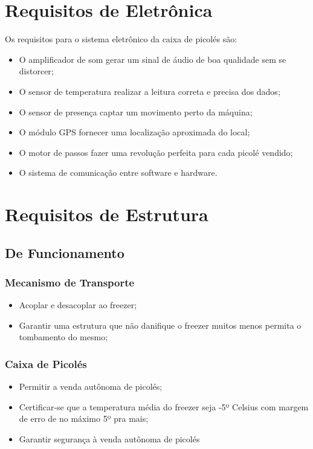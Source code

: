 \section{Requisitos de Eletrônica}

Os requisitos para o sistema eletrônico da caixa de picolés são:

\begin{itemize}
	\item O amplificador de som gerar um sinal de áudio de boa qualidade sem se distorcer;
    \item O sensor de temperatura realizar a leitura correta e precisa dos dados;
    \item O sensor de presença captar um movimento perto da máquina;
    \item O módulo GPS fornecer uma localização aproximada do local;
    \item O motor de passos fazer uma revolução perfeita para cada picolé vendido;
    \item O sistema de comunicação entre software e hardware.
\end{itemize}

\section{Requisitos de Estrutura}

\subsection{De Funcionamento}

\subsubsection{Mecanismo de Transporte}
\begin{itemize}
\item Acoplar e desacoplar ao freezer;
\item Garantir uma estrutura que não danifique o freezer muitos menos permita o tombamento do mesmo;
\end{itemize}

\subsubsection{Caixa de Picolés}
\begin{itemize}
\item Permitir a venda autônoma de picolés;
\item Certificar-se que a temperatura média do freezer seja -5º Celsius com margem de erro de no máximo 5º pra mais;
\item Garantir segurança à venda autônoma de picolés
\end{itemize}

